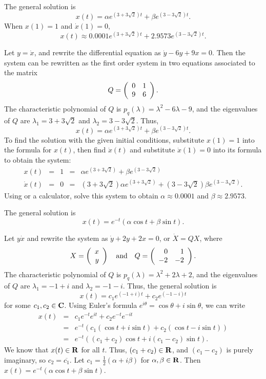 \ans The general solution is
\[
x(t) = \alpha e^{(3 + 3\sqrt{2})t} + \beta e^{(3 - 3\sqrt{2})t}.
\]
When $x(1) = 1$ and $\dot{x}(1) = 0$,
\[
x(t) \approx 0.0001e^{(3 + 3\sqrt{2})t} +
2.9573e^{(3 - 3\sqrt{2})t}.
\]

\soln Let $y = \dot{x}$, and rewrite the differential equation as
$\dot{y} - 6y + 9x = 0$.  Then the system can be rewritten as the first
order system in two equations associated to the matrix
\[
Q = \left(\begin{array}{rr} 0 & 1\\ 9 &6\end{array}\right).
\]
The characteristic polynomial of $Q$ is $p_q(\lambda) = \lambda^2 
- 6\lambda - 9$, and the eigenvalues of $Q$ are $\lambda_1 = 3 +
3\sqrt{2}$ and $\lambda_2 = 3 - 3\sqrt{2}$.  Thus,
\[
x(t) = \alpha e^{(3 + 3\sqrt{2})t} + \beta e^{(3 - 3\sqrt{2})t}.
\]
To find the solution with the given initial conditions, substitute $x(1)
= 1$ into the formula for $x(t)$, then find $\dot{x}(t)$ and substitute
$\dot{x}(1) = 0$ into its formula to obtain the system:
\[
\begin{array}{rcccl}
x(t) & = & 1 & = & \alpha e^{(3 + 3\sqrt{2})} + \beta e^{(3 - 3\sqrt{2})} \\
\dot{x}(t) & = & 0 & = & (3 + 3\sqrt{2})\alpha e^{(3 + 3\sqrt{2})}
+ (3 - 3\sqrt{2})\beta e^{(3 - 3\sqrt{2})}.
\end{array}
\]
Using \Matlab or a calculator, solve this system to obtain $\alpha \approx
0.0001$ and $\beta \approx 2.9573$.

\ans The general solution is
\[
x(t) = e^{-t}(\alpha \cos{t} + \beta \sin{t}).
\]

\soln Let $y \dot{x}$ and rewrite the system as $\dot{y} + 2y + 2x = 0$,
or $\dot{X} = QX$, where
\[
X = \left(\begin{array}{r} x \\ y\end{array}\right) \quad\mbox{and}\quad Q = \left(\begin{array}{rr} 0 & 1\\ -2 &-2\end{array}\right).
\]
The characteristic polynomial of $Q$ is $p_q(\lambda) = \lambda^2 
+ 2\lambda + 2$, and the eigenvalues of $Q$ are $\lambda_1 = -1 + i$ and
$\lambda_2 = -1 - i$.  Thus, the general solution is
\[
x(t) = c_1e^{(-1 + i)t} + c_2e^{(-1 - i)t}
\]
for some $c_1, c_2 \in \mbox{$\bf{C}$}$.  Using Euler's formula $e^{i\theta} =
\cos\theta + i\sin\theta$, we can write
\[
\begin{array}{rcl}
x(t) & = & c_1e^{-t}e^{it} + c_2e^{-t}e^{-it} \\
& = & e^{-t}(c_1(\cos{t} + i\sin{t}) + c_2(\cos{t} - i\sin{t})) \\
& = & e^{-t}((c_1 + c_2)\cos{t} + i(c_1 - c_2)\sin{t}).
\end{array}
\]
We know that $x(t) \in \mbox{$\bf{R}$}$ for all $t$.  Thus, $(c_1 + c_2) \in \mbox{$\bf{R}$}$, and
$(c_1 - c_2)$ is purely imaginary, so $c_2 = \overline{c_1}$.  Let
$c_1 = \frac{1}{2}(\alpha + i\beta)$ for $\alpha, \beta \in \mbox{$\bf{R}$}$. 
Then $x(t) = e^{-t}(\alpha\cos{t} + \beta\sin{t})$.

